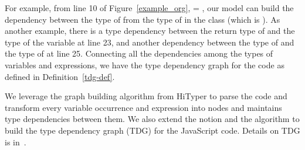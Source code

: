 For example, from line 10 of Figure~\ref{example_org},  =
  , our model
can build the dependency between the type of  from the
type of  in the  class (which is
). As another example, there is a type dependency between
the return type of  and
the type of the variable  at line 23, and
another dependency between the type of  and the
type of  at line 25.  Connecting
all the dependencies among the types of variables and expressions, we
have the type dependency graph for the code as defined in
Definition~\ref{tdg-def}.

We leverage the graph building algorithm from HiTyper to parse the
code and transform every variable occurrence and expression into nodes
and maintains type dependencies between them. We also extend the
notion and the algorithm to build the type dependency graph (TDG) for
the JavaScript code. Details on TDG is in~\cite{type-graph-icse22}.
